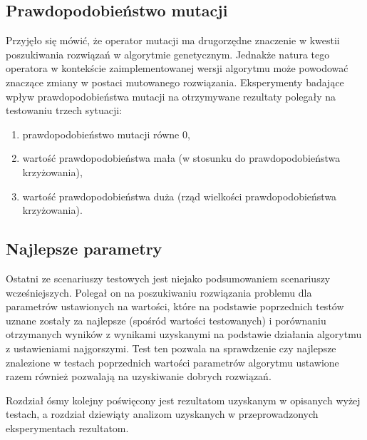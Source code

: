 \subsection{Prawdopodobieństwo mutacji}
Przyjęło się mówić, że operator mutacji ma drugorzędne znaczenie w kwestii poszukiwania rozwiązań w algorytmie genetycznym. Jednakże natura tego operatora w kontekście zaimplementowanej wersji algorytmu może powodować znaczące zmiany w postaci mutowanego rozwiązania. Eksperymenty badające wpływ prawdopodobieństwa mutacji na otrzymywane rezultaty polegały na testowaniu trzech sytuacji:
\begin{enumerate}
\item prawdopodobieństwo mutacji równe 0,
\item wartość prawdopodobieństwa mała (w stosunku do prawdopodobieństwa krzyżowania),
\item wartość prawdopodobieństwa duża (rząd wielkości prawdopodobieństwa krzyżowania).
\end{enumerate}

\subsection{Najlepsze parametry}
Ostatni ze scenariuszy testowych jest niejako podsumowaniem scenariuszy wcześniejszych. Polegał on na poszukiwaniu rozwiązania problemu dla parametrów ustawionych na wartości, które na podstawie poprzednich testów uznane zostały za najlepsze (spośród wartości testowanych) i porównaniu otrzymanych wyników z wynikami uzyskanymi na podstawie działania algorytmu z ustawieniami najgorszymi. Test ten pozwala na sprawdzenie czy najlepsze znalezione w testach poprzednich wartości parametrów algorytmu ustawione razem również pozwalają na uzyskiwanie dobrych rozwiązań.

Rozdział ósmy kolejny poświęcony jest rezultatom uzyskanym w opisanych wyżej testach, a rozdział dziewiąty analizom uzyskanych w przeprowadzonych eksperymentach rezultatom. 